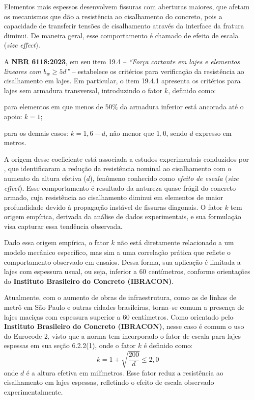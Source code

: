 Elementos mais espessos desenvolvem fissuras com aberturas maiores, que afetam os mecanismos que dão a resistência ao cisalhamento do concreto, pois a capacidade de transferir tensões de cisalhamento através da interface da fratura diminui. De maneira geral, esse comportamento é chamado de efeito de escala (\textit{size effect}).

A \textbf{NBR 6118:2023}, em seu item 19.4 -- \textit{“Força cortante em lajes e elementos lineares com $b_w \geq 5d$”} -- estabelece os critérios para verificação da resistência ao cisalhamento em lajes. Em particular, o item 19.4.1 apresenta os critérios para lajes sem armadura transversal, introduzindo o fator $k$, definido como:

\begin{alineas}
    \item para elementos em que menos de 50\% da armadura inferior está ancorada até o apoio: $k = 1$;
    \item para os demais casos: $k = 1{,}6 - d$, não menor que $1{,}0$, sendo $d$ expresso em metros.
\end{alineas}

A origem desse coeficiente está associada a estudos experimentais conduzidos por \textcite{Hedman1975shear}, que identificaram a redução da resistência nominal ao cisalhamento com o aumento da altura efetiva ($d$), fenômeno conhecido como \textit{efeito de escala} (\textit{size effect}). Esse comportamento é resultado da natureza quase-frágil do concreto armado, cuja resistência ao cisalhamento diminui em elementos de maior profundidade devido à propagação instável de fissuras diagonais. O fator $k$ tem origem empírica, derivada da análise de dados experimentais, e sua formulação visa capturar essa tendência observada.

Dado essa origem empírica, o fator $k$ não está diretamente relacionado a um modelo mecânico específico, mas sim a uma correlação prática que reflete o comportamento observado em ensaios. Dessa forma, sua aplicação é limitada a lajes com espessura usual, ou seja, inferior a 60 centímetros, conforme orientações do \textbf{Instituto Brasileiro do Concreto (IBRACON)}. 

Atualmente, com o aumento de obras de infraestrutura, como as de linhas de metrô em São Paulo e outras cidades brasileiras, torna--se comum a presença de lajes maciças com espessura superior a 60 centímetros. Como orientado pelo \textbf{Instituto Brasileiro do Concreto (IBRACON)}, nesse caso é comum o uso do Eurocode 2, visto que a norma tem incorporado o fator de escala para lajes espessas em sua seção 6.2.2(1), onde o fator $k$ é definido como: 
\begin{equation}
    k = 1+ \sqrt{\frac{200}{d}} \leq 2,0
\end{equation}
onde $d$ é a altura efetiva em milímetros. Esse fator reduz a resistência ao cisalhamento em lajes espessas, refletindo o efeito de escala observado experimentalmente. 

